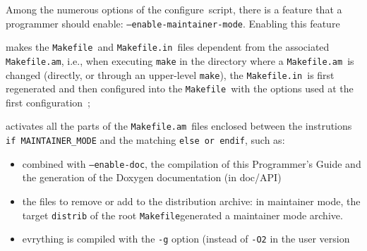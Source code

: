 \documentclass[11pt,a4paper]{report}
\newcommand{\configure}{\textsf{configure}}
\newcommand{\makeam}{\texttt{Makefile.am}}
\newcommand{\makein}{\texttt{Makefile.in}}
\newcommand{\make}{\texttt{Makefile}}
\begin{document}
Among the numerous options of the \configure\ script, there is a feature that
a programmer should enable: \texttt{--enable-maintainer-mode}. Enabling this feature
\begin{description}
\item{}makes the \make\ and \makein\ files dependent from the associated \makeam,
    i.e., when executing \texttt{make} in the directory where a \makeam\ is
    changed (directly, or through an upper-level \texttt{make}), the \makein\ is
    first regenerated and then configured into the \make\ with the options used
    at the first configuration~;
\item{}activates all the parts of the \makeam\ files enclosed between the
    instrutions \texttt{\footnotesize if MAINTAINER\_MODE} and the matching
    \texttt{\footnotesize else or endif}, such as:
    \begin{itemize}
    \item{combined with \texttt{--enable-doc}, the compilation of this
        Programmer's Guide and the generation of the Doxygen documentation (in
        doc/API)}
    \item{the files to remove or add to the distribution archive: in maintainer
        mode, the target \texttt{distrib} of the root \make generated a
        maintainer mode archive.}
    \item{evrything is compiled with the \texttt{-g} option (instead of
        \texttt{-O2} in the user version}
    \end{itemize}
\end{description}
\end{document}
